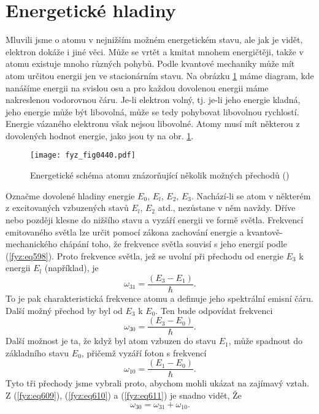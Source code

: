   \section{Energetické hladiny}\label{fyz:IchapXXXVIIIsecV}
    Mluvili jsme o atomu v nejnižším možném energetickém stavu, ale jak je vidět, elektron dokáže i
    jiné věci. Může se vrtět a kmitat mnohem energičtěji, takže v atomu existuje mnoho různých
    pohybů. Podle kvantové mechaniky může mít atom určitou energii jen ve stacionárním stavu. Na
    obrázku \ref{fyz:fig0440} máme diagram, kde nanášíme energii na svislou osu a pro každou
    dovolenou energii máme nakreslenou vodorovnou čáru. Je-li elektron volný, tj. je-li jeho energie
    kladná, jeho energie může být libovolná, může se tedy pohybovat libovolnou rychlostí. Energie
    vázaného elektronu však nejsou libovolné. Atomy musí mít některou z dovolených hodnot energie,
    jako jsou ty na obr. \ref{fyz:fig0440}.
    \begin{figure}[ht!] %
      \centering
      \texttt{[image: fyz\_fig0440.pdf]}
      \caption{Energetické schéma atomu znázorňující několik možných přechodů
              (\cite[s.~518]{Feynman01})}
      \label{fyz:fig0440}
    \end{figure}

    Označme dovolené hladiny energie \(E_0\), \(E_l\), \(E_2\), \(E_3\). Nachází-li se atom v
    některém z excitovaných vzbuzených stavů \(E_l\), \(E_2\) atd., nezůstane v něm navždy. Dříve
    nebo později klesne do nižšího stavu a vyzáří energii ve formě světla. Frekvencí emitovaného
    světla lze určit pomocí zákona zachování energie a kvantově-mechanického chápání toho, že
    frekvence světla souvisí s jeho energií podle (\ref{fyz:eq598}). Proto frekvence světla, jež se
    uvolní při přechodu od energie \(E_3\) k energii \(E_l\) (například), je
    \begin{equation}\label{fyz:eq609}
      ω_{31} = \frac{(E_3−E_1)}{ℏ}.
    \end{equation}
    To je pak charakteristická frekvence atomu a definuje jeho spektrální emisní čáru. Další možný
    přechod by byl od \(E_3\) k \(E_0\). Ten bude odpovídat frekvenci
    \begin{equation}\label{fyz:eq610}
      ω_{30} = \frac{(E_3−E_0)}{ℏ}.
    \end{equation}
    Další možnost je ta, že když byl atom vzbuzen do stavu \(E_1\), může spadnout do základního
    stavu \(E_0\), přičemž vyzáří foton s frekvencí
    \begin{equation}\label{fyz:eq611}
      ω_{10} = \frac{(E_1−E_0)}{ℏ}.
    \end{equation}
    Tyto tři přechody jsme vybrali proto, abychom mohli ukázat na zajímavý vztah. Z
    (\ref{fyz:eq609}), (\ref{fyz:eq610}) a (\ref{fyz:eq611}) je snadno vidět, Že
    \begin{equation}\label{fyz:eq612}
      ω_{30} = ω_{31} + ω_{10}.
    \end{equation}

